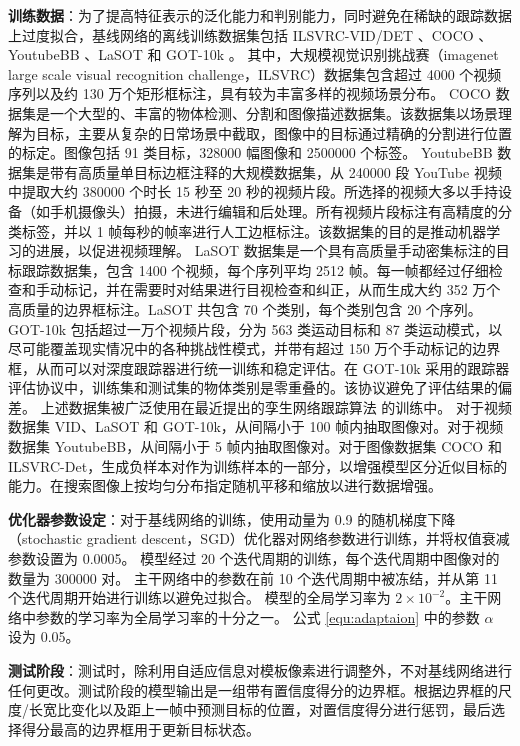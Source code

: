 \textbf{训练数据}：为了提高特征表示的泛化能力和判别能力，同时避免在稀缺的跟踪数据上过度拟合，基线网络的离线训练数据集包括 ILSVRC-VID/DET \cite{VID}、COCO \cite{COCO}、YoutubeBB \cite{YTBB}、LaSOT \cite{LaSOT} 和 GOT-10k \cite{GOT-10k}。
其中，大规模视觉识别挑战赛（imagenet large scale visual recognition challenge，ILSVRC）数据集包含超过 4000 个视频序列以及约 130 万个矩形框标注，具有较为丰富多样的视频场景分布。
COCO 数据集是一个大型的、丰富的物体检测、分割和图像描述数据集。该数据集以场景理解为目标，主要从复杂的日常场景中截取，图像中的目标通过精确的分割进行位置的标定。图像包括 91 类目标，328000 幅图像和 2500000 个标签。
YoutubeBB 数据集是带有高质量单目标边框注释的大规模数据集，从 240000 段 YouTube 视频中提取大约 380000 个时长 15 秒至 20 秒的视频片段。所选择的视频大多以手持设备（如手机摄像头）拍摄，未进行编辑和后处理。所有视频片段标注有高精度的分类标签，并以 1 帧每秒的帧率进行人工边框标注。该数据集的目的是推动机器学习的进展，以促进视频理解。
LaSOT 数据集是一个具有高质量手动密集标注的目标跟踪数据集，包含 1400 个视频，每个序列平均 2512 帧。每一帧都经过仔细检查和手动标记，并在需要时对结果进行目视检查和纠正，从而生成大约 352 万个高质量的边界框标注。LaSOT 共包含 70 个类别，每个类别包含 20 个序列。
GOT-10k \cite{GOT-10k} 包括超过一万个视频片段，分为 563 类运动目标和 87 类运动模式，以尽可能覆盖现实情况中的各种挑战性模式，并带有超过 150 万个手动标记的边界框，从而可以对深度跟踪器进行统一训练和稳定评估。在 GOT-10k 采用的跟踪器评估协议中，训练集和测试集的物体类别是零重叠的。该协议避免了评估结果的偏差。
上述数据集被广泛使用在最近提出的孪生网络跟踪算法 \cite{SiamRPN++,Wang2018SiamMask} 的训练中。
对于视频数据集 VID、LaSOT 和 GOT-10k，从间隔小于 100 帧内抽取图像对。对于视频数据集 YoutubeBB，从间隔小于 5 帧内抽取图像对。对于图像数据集 COCO 和 ILSVRC-Det，生成负样本对作为训练样本的一部分，以增强模型区分近似目标的能力。在搜索图像上按均匀分布指定随机平移和缩放以进行数据增强。

\textbf{优化器参数设定}：对于基线网络的训练，使用动量为 0.9 的随机梯度下降（stochastic gradient descent，SGD）优化器对网络参数进行训练，并将权值衰减参数设置为 0.0005。
模型经过 20 个迭代周期的训练，每个迭代周期中图像对的数量为 300000 对。
主干网络中的参数在前 10 个迭代周期中被冻结，并从第 11 个迭代周期开始进行训练以避免过拟合。
模型的全局学习率为 $2\times 10^{-2}$。主干网络中参数的学习率为全局学习率的十分之一。
公式 \ref{equ:adaptaion} 中的参数 $\alpha$ 设为 0.05。

\textbf{测试阶段}：测试时，除利用自适应信息对模板像素进行调整外，不对基线网络进行任何更改。测试阶段的模型输出是一组带有置信度得分的边界框。根据边界框的尺度/长宽比变化以及距上一帧中预测目标的位置，对置信度得分进行惩罚，最后选择得分最高的边界框用于更新目标状态。

